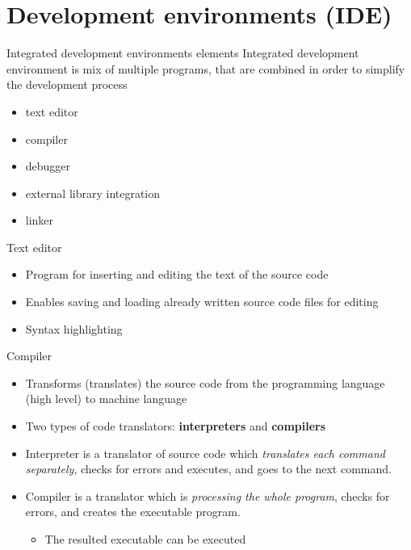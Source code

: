 \section{Development environments (IDE)}

\begin{frame}{Integrated development environments elements}
Integrated development environment is mix of multiple programs, that are
combined in order to simplify the development process
\begin{itemize}
  \item text editor
  \item compiler
  \item debugger
  \item external library integration
  \item linker
\end{itemize}
\end{frame}

\begin{frame}{Text editor}
\begin{itemize}
  \item Program for inserting and editing the text of the source code
  \item Enables saving and loading already written source code files
  for editing
  \item Syntax highlighting
\end{itemize}
\end{frame}

\begin{frame}{Compiler}
\begin{itemize}
  \item Transforms (translates) the source code from the programming language
  (high level) to machine language
  \item Two types of code translators:
  \textbf{interpreters} and \textbf{compilers}
  \item Interpreter is a translator of source code which \emph{translates each
  command separately}, checks for errors and executes, and goes to the next
  command.
  \item Compiler is a translator which is \emph{processing the whole
  program}, checks for errors, and creates the executable program.
  \begin{itemize}
  \item The resulted executable can be executed
  \end{itemize}
\end{itemize}
\end{frame}

